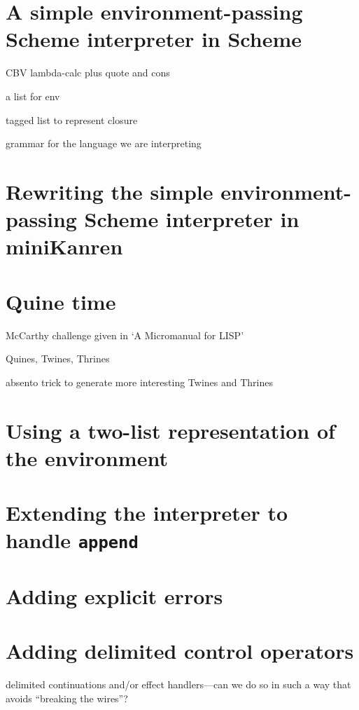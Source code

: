 \documentclass{book}
\begin{document}
\chapter{A simple environment-passing Scheme interpreter in Scheme}%

CBV lambda-calc plus quote and cons

a list for env

tagged list to represent closure

grammar for the language we are interpreting


\chapter{Rewriting the simple environment-passing Scheme interpreter in miniKanren}%


\chapter{Quine time}%

McCarthy challenge given in `A Micromanual for LISP'

Quines, Twines, Thrines

absento trick to generate more interesting Twines and Thrines


\chapter{Using a two-list representation of the environment}%


\chapter{Extending the interpreter to handle \texttt{append}}%


\chapter{Adding explicit errors}%


\chapter{Adding delimited control operators}%

delimited continuations and/or effect handlers---can we do so in such a way that avoids ``breaking the wires''?
\end{document}
